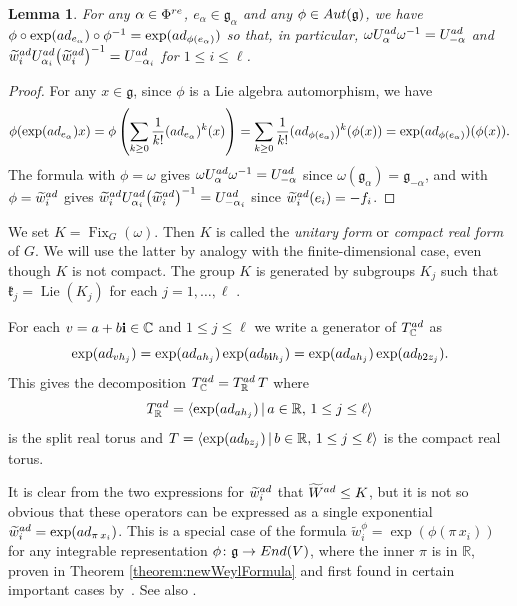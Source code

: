 \documentclass[11pt]{article}
\numberwithin{equation}{section}
\numberwithin{equation}{section}
\newtheorem{Lemma}[Theorem]{Lemma}
\def\C{{\mathbb C}}
\def\R{\mathbb{R}}
\def\a{\alpha}
\def\roots{{\Phi}}
\def\wtil{\widetilde w}
\def\Wtil{\widetilde W}
\def\la{\langle}
\def\ra{\rangle}
\def\bi{{\bf i}}
\def\fg{\mathfrak{g}}
\def\k{\mathfrak{k}}
\begin{document}
\begin{Lemma}\label{lemma:auto_action_on_real_root_groups}
For any $\a\in\roots^{\rm re}$, $e_\a\in\fg_\a$ and any $\phi\in {\rm Aut}(\fg)$, we have
$\phi\circ \exp({\rm ad}_{e_\a}) \circ\phi^{-1} = \exp({\rm ad}_{\phi(e_\a)})$ so that, in particular,
$\omega U^{\rm ad}_\a \omega^{-1} = U^{\rm ad}_{-\a}$ and $\wtil^{\rm ad}_i U^{\rm ad}_{\a_i} \big(\wtil^{\rm ad}_i\big)^{-1} = U^{\rm ad}_{-\a_i}$ for $1\leq i\leq\ell$.
\end{Lemma}

\begin{proof}For any $x\in\fg$, since $\phi$ is a Lie algebra automorphism, we have
\[\phi(\exp({\rm ad}_{e_\a})x) = \phi\left( \sum_{k\geq 0} \frac{1}{k!} ({\rm ad}_{e_\a})^k (x) \right)
= \sum_{k\geq 0} \frac{1}{k!} ({\rm ad}_{\phi(e_\a)})^k (\phi(x)) = \exp({\rm ad}_{\phi(e_\a)}) (\phi(x)).\]
The formula with $\phi = \omega$ gives $\omega U^{\rm ad}_\a \omega^{-1} = U^{\rm ad}_{-\a}$ since $\omega(\fg_\a) = \fg_{-\a}$, and with $\phi = \wtil^{\rm ad}_i$ gives $\wtil^{\rm ad}_i U^{\rm ad}_{\a_i} \big(\wtil^{\rm ad}_i\big)^{-1} = U^{\rm ad}_{-\a_i}$ since $\wtil^{\rm ad}_i(e_i) = -f_i$.
\end{proof}

We set $K=\operatorname{Fix}_G(\omega)$. Then $K$ is called the {\it unitary form} or {\it compact real form} of $G$. We will use the latter by analogy with the finite-dimensional case, even though $K$ is not compact. The group $K$ is generated by subgroups $K_j$ such that $\k_j = \operatorname{Lie}(K_j)$ for each $j=1,\dots ,\ell$ \cite{Caprace09, KacPeterson85c, Tits86b}.

For each $v = a + b\bi\in\C$ and $1\leq j\leq\ell$ we write a generator of $T_\C^{\rm ad}$ as
\[\exp({\rm ad}_{vh_j}) = \exp({\rm ad}_{ah_j}) \exp({\rm ad}_{b\bi h_j}) = \exp({\rm ad}_{ah_j}) \exp({\rm ad}_{b2 z_j}).\]
This gives the decomposition $T_\C^{\rm ad} = T_\R^{\rm ad}\, T$ where
\begin{equation}\label{equation:split_real_torus}
T_\R^{\rm ad} = \la \exp({\rm ad}_{ah_j}) \, |\, a\in\R,\, 1\leq j\leq\ell\ra
\end{equation}
is the split real torus and $T = \la \exp({\rm ad}_{b z_j}) \, |\, b\in\R, \, 1\leq j\leq\ell\ra$ is the compact real torus.

It is clear from the two expressions for $\wtil^{\rm ad}_i$ that $\Wtil^{\rm ad}\leq K$, but it is not so obvious that these operators can be expressed as
a single exponential $\wtil^{\rm ad}_i = \exp({\rm ad}_{\pi\, x_i})$. This is a special case of the formula $\wtil^{\phi}_i = \exp(\phi(\pi\, x_i))$ for any
integrable representation $\phi\colon \fg\to {\rm End}(V)$, where the inner $\pi$ is in $\R$, proven in Theorem \ref{theorem:newWeylFormula}
and first found in certain important cases by~\cite{DamourHillmann09}.
See also \cite{HainkeKoehlLevy15,KleinschmidtNicolai13}.
\end{document}
